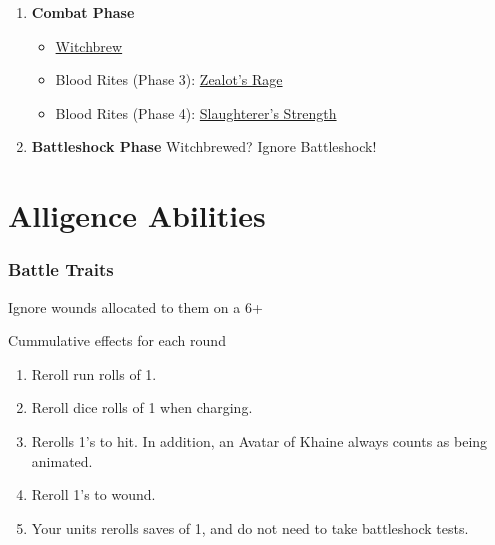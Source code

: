 \begin{enumerate}
    \item{\textbf{Combat Phase}}
        \begin{itemize}
            \item \hyperref[witchbrew]{Witchbrew}
            \item Blood Rites (Phase 3): \hyperref[zealots-rage]{Zealot's Rage}
            \item Blood Rites (Phase 4):
                \hyperref[slaughterers-strength]{Slaughterer's Strength}
        \end{itemize}
    \item{\textbf{Battleshock Phase}} Witchbrewed? Ignore Battleshock!
\end{enumerate}


\hypertarget{alligence-abilities}{%
    \section{Alligence Abilities}\label{alligence-abilities}}

\hypertarget{battle-traits}{%
    \subsubsection{Battle Traits}\label{battle-traits}}
\begin{description}[align=left]
    \item [\htarget{fanatical-faith}{Fanatical Faith}] Ignore wounds allocated to them on a 6+
\item [Blood Rites] Cummulative effects for each round
  \begin{enumerate}
  \item \textbf{} Reroll
      run rolls of 1.
  \item \textbf{} Reroll dice rolls of
      1 when charging.
  \item \textbf{} Rerolls 1's to hit. In
      addition, an Avatar of Khaine always counts as being animated.
  \item \textbf{} Reroll
      1's to wound.
  \item \textbf{} Your
      units rerolls saves of 1, and do not need to take battleshock tests.
  \end{enumerate}
\end{description}

